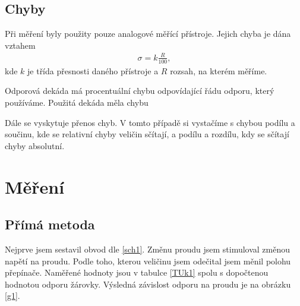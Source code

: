 \documentclass[a4paper,12pt]{article}
\begin{document}
\subsection{Chyby}
Při měření byly použity pouze analogové měřící přístroje. Jejich chyba je dána vztahem
\begin{eqnarray}
\sigma = k\frac{R}{100},
\end{eqnarray}
kde $k$ je třída přesnosti daného přístroje a $R$ rozsah, na kterém měříme.

Odporová dekáda má procentuální chybu odpovídající řádu odporu, který používáme. Použitá dekáda měla chybu 

Dále se vyskytuje přenos chyb. V tomto případě si vystačíme s chybou podílu a součinu, kde se relativní 
chyby veličin sčítají, a podílu a rozdílu, kdy se sčítají chyby absolutní.

\section{Měření}
\subsection{Přímá metoda}
Nejprve jsem sestavil obvod dle \ref{sch1}. Změnu proudu jsem stimuloval změnou napětí na proudu. Podle toho, kterou veličinu jsem odečital jsem měnil polohu přepínače. 
Naměřené hodnoty jsou v tabulce \ref{TUk1} spolu s dopočtenou hodnotou odporu žárovky. Výsledná závislost odporu na proudu je na obrázku \ref{g1}.
\end{document}
